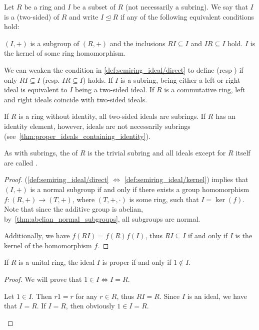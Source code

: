 \begin{definition}\label{def:semiring_ideal}
  Let \( R \) be a ring and \( I \) be a subset of \( R \) (not necessarily a subring). We say that \( I \) is a (two-sided)  of \( R \) and write \( I \unlhd R \) if any of the following equivalent conditions hold:
  \begin{defenum}
     \( (I, +) \) is a subgroup of \( (R, +) \) and the inclusions \( RI \subseteq I \) and \( IR \subseteq I \) hold.
     \( I \) is the kernel of some ring homomorphism.
  \end{defenum}

  We can weaken the condition in \ref{def:semiring_ideal/direct} to define  (resp ) if only \( RI \subseteq I \) (resp. \( IR \subseteq I \)) holds. If \( I \) is a subring, being either a left or right ideal is equivalent to \( I \) being a two-sided ideal. If \( R \) is a commutative ring, left and right ideals coincide with two-sided ideals.

  If \( R \) is a ring without identity, all two-sided ideals are subrings. If \( R \) has an identity element, however, ideals are not necessarily subrings (see~\cref{thm:proper_ideals_containing_identity}).

  As with subrings, the  of \( R \) is the trivial subring and all ideals except for \( R \) itself are called .
\end{definition}
\begin{proof}
  (\ref{def:semiring_ideal/direct} \( \iff \) \ref{def:semiring_ideal/kernel})  implies that \( (I, +) \) is a normal subgroup if and only if there exists a group homomorphism \( f: (R, +) \to (T, +) \), where \( (T, +, \cdot) \) is some ring, such that \( I = \ker(f) \). Note that since the additive group is abelian, by~\cref{thm:abelian_normal_subgroups}, all subgroups are normal.

  Additionally, we have \( f(RI) = f(R)f(I) \), thus \( RI \subseteq I \) if and only if \( I \) is the kernel of the homomorphism \( f \).
\end{proof}

\begin{proposition}\label{thm:proper_ideals_containing_identity}
  If \( R \) is a unital ring, the ideal \( I \) is proper if and only if \( 1 \not\in I \).
\end{proposition}
\begin{proof}
  We will prove that \( 1 \in I \iff I = R \).

  \begin{description}
    \Implies Let \( 1 \in I \). Then \( r1 = r \) for any \( r \in R \), thus \( RI = R \). Since \( I \) is an ideal, we have that \( I = R \).
    \ImpliedBy If \( I = R \), then obviously \( 1 \in I = R \).
  \end{description}
\end{proof}


